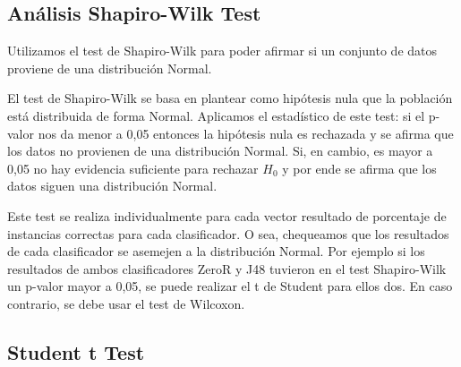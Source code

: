 
\subsection{Análisis Shapiro-Wilk Test}



Utilizamos el test de Shapiro-Wilk para poder afirmar si un conjunto de datos proviene de una distribución Normal.


El test de Shapiro-Wilk se basa en plantear como hipótesis nula que la población está distribuida de forma Normal. Aplicamos el estadístico de este test: si el p-valor nos da menor a 0,05 entonces la hipótesis nula es rechazada y se afirma que los datos no provienen de una distribución Normal. Si, en cambio, es mayor a 0,05 no hay evidencia suficiente para rechazar $H_0$ y por ende se afirma que los datos siguen una distribución Normal.

Este test se realiza individualmente para cada vector resultado de porcentaje de instancias correctas para cada clasificador. O sea, chequeamos que los resultados de cada clasificador se asemejen a la distribución Normal. Por ejemplo si los resultados de ambos clasificadores ZeroR y J48 tuvieron en el test Shapiro-Wilk un p-valor mayor a 0,05, se puede realizar el t de Student para ellos dos. En caso contrario, se debe usar el test de Wilcoxon.

\subsection{Student t Test}

